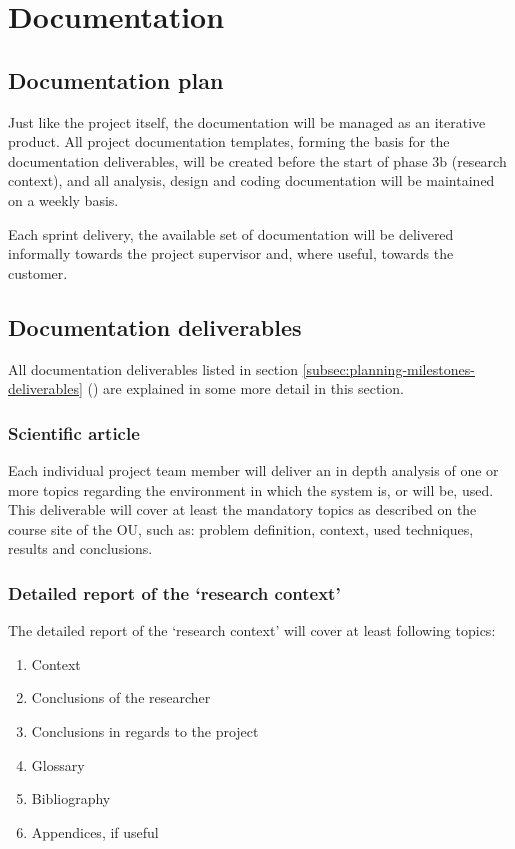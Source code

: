 
\section{Documentation}
\label{sec:documentation}
\subsection{Documentation plan}
Just like the project itself, the documentation will be managed as an iterative product.
All project documentation templates, forming the basis for the documentation deliverables, will be created before the start of phase 3b (research context), and all analysis, design and coding documentation will be maintained on a weekly basis.

Each sprint delivery, the available set of documentation will be delivered informally towards the project supervisor and, where useful, towards the customer.

\subsection{Documentation deliverables}
All documentation deliverables listed in section \ref{subsec:planning-milestones-deliverables} () are explained in some more detail in this section.

\subsubsection{Scientific article}
Each individual project team member will deliver an in depth analysis of one or more topics regarding the environment in which the system is, or will be, used.
This deliverable will cover at least the mandatory topics as described on the course site of the OU, such as: problem definition, context, used techniques, results and conclusions.


\subsubsection{Detailed report of the `research context'}
The detailed report of the `research context' will cover at least following topics:

	\begin{enumerate}
		\item Context
		\item Conclusions of the researcher
		\item Conclusions in regards to the project
		\item Glossary
		\item Bibliography
		\item Appendices, if useful
	\end {enumerate}

